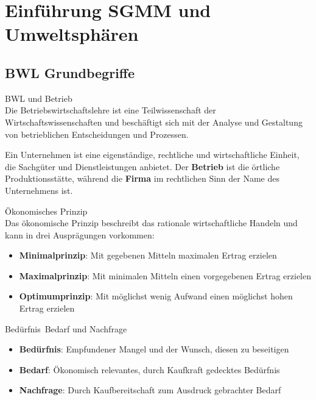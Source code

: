 \section{Einführung SGMM und Umweltsphären}

\subsection{BWL Grundbegriffe}

\begin{definition}{BWL und Betrieb}\\
Die Betriebswirtschaftslehre ist eine Teilwissenschaft der Wirtschaftswissenschaften und beschäftigt sich mit der Analyse und Gestaltung von betrieblichen Entscheidungen und Prozessen.

Ein Unternehmen ist eine eigenständige, rechtliche und wirtschaftliche Einheit, die Sachgüter und Dienstleistungen anbietet. Der \textbf{Betrieb} ist die örtliche Produktionsstätte, während die \textbf{Firma} im rechtlichen Sinn der Name des Unternehmens ist.
\end{definition}

\begin{definition}{Ökonomisches Prinzip}\\
Das ökonomische Prinzip beschreibt das rationale wirtschaftliche Handeln und kann in drei Ausprägungen vorkommen:
\begin{itemize}
    \item \textbf{Minimalprinzip}: Mit gegebenen Mitteln maximalen Ertrag erzielen
    \item \textbf{Maximalprinzip}: Mit minimalen Mitteln einen vorgegebenen Ertrag erzielen
    \item \textbf{Optimumprinzip}: Mit möglichst wenig Aufwand einen möglichst hohen Ertrag erzielen
\end{itemize}
\end{definition}

\begin{definition}{Bedürfnis\, Bedarf und Nachfrage}\\
\begin{itemize}
    \item \textbf{Bedürfnis}: Empfundener Mangel und der Wunsch, diesen zu beseitigen
    \item \textbf{Bedarf}: Ökonomisch relevantes, durch Kaufkraft gedecktes Bedürfnis
    \item \textbf{Nachfrage}: Durch Kaufbereitschaft zum Ausdruck gebrachter Bedarf
\end{itemize}
\end{definition}

